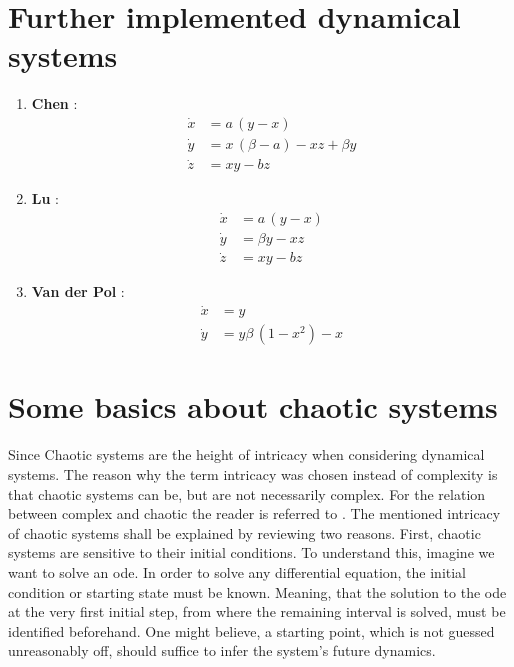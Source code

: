 \appendix
\chapter{Further implemented dynamical systems}
\label{ch_Ap_Dyna}
\begin{enumerate}
    \item \textbf{Chen} \cite{Chen1999}: 
    \begin{equation}
        \label{eq_8_Chen}
        \begin{aligned}
            \dot x &= a\, (y - x) \\
            \dot y &= x \,(\beta - a) - xz + \beta y \\
            \dot z &= x y -b z
        \end{aligned}
    \end{equation}

    \item \textbf{Lu} \cite{Lu2002}:
    \begin{equation}
        \label{eq_9_Lu}
        \begin{aligned}
            \dot x &= a \, (y -x) \\
            \dot y &= \beta y -x z  \\
            \dot z &= x y - b z
        \end{aligned}
    \end{equation}

    \item \textbf{Van der Pol} \cite{VanderPol}:
    \begin{equation}
        \label{eq_14_VDP}
        \begin{aligned}
            \dot x &= y \\
            \dot y &= y \beta\,(1-x^2) -x
        \end{aligned}
    \end{equation}

\end{enumerate}

\chapter{Some basics about chaotic systems}
\label{ch_Ap_Chaotic}
Since 
Chaotic systems are the height 
of intricacy when considering dynamical systems. 
The reason why the term intricacy was chosen
instead of complexity is that chaotic systems can be, but are not necessarily 
complex. For the relation between complex and 
chaotic the reader is referred to \cite{Rickles2007}. 
The mentioned intricacy of chaotic systems shall be explained by 
reviewing two reasons. First, 
chaotic systems are sensitive to their initial conditions. 
To understand this, imagine we want to solve an \gls{ode}. In order to solve any
differential 
equation, the initial condition or starting state must be known. Meaning, that the 
solution to the \gls{ode} at the very first initial step, from where the 
remaining interval is solved, must be identified beforehand. 
One might believe, a starting point, which is not guessed unreasonably off, 
should suffice to infer the system's future dynamics.\newline

